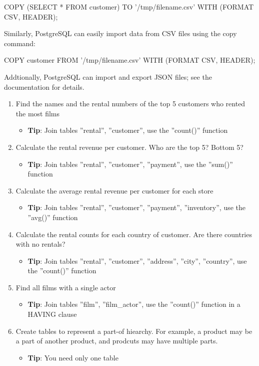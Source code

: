\begin{withcode}
\begin{sqlcode}
COPY (SELECT * FROM customer) 
  TO '/tmp/filename.csv' 
  WITH (FORMAT CSV, HEADER);
\end{sqlcode}

Similarly, PostgreSQL can easily import data from CSV files using the copy command:

\begin{sqlcode}
COPY customer 
  FROM '/tmp/filename.csv' 
  WITH (FORMAT CSV, HEADER);
\end{sqlcode}

Addtionally, PostgreSQL can import and export JSON files; see the documentation for details.

\begin{exerciseboxcomputer}
\begin{enumerate}
  \item Find the names and the rental numbers of the top 5 customers who rented the most films
  \begin{itemize}
    \item \textbf{Tip}: Join tables ''rental'', ''customer'', use the ''count()'' function
  \end{itemize}
  \item Calculate the rental revenue per customer. Who are the top 5? Bottom 5?
  \begin{itemize}
    \item \textbf{Tip}: Join tables ''rental'', ''customer'', ''payment'', use the ''sum()'' function
  \end{itemize}
  \item Calculate the average rental revenue per customer for each store
  \begin{itemize}
    \item \textbf{Tip}: Join tables ''rental'', ''customer'', ''payment'', ''inventory'', use the ''avg()'' function
  \end{itemize}
  \item Calculate the rental counts for each country of customer. Are there countries with no rentals?
  \begin{itemize}
    \item \textbf{Tip}: Join tables ''rental'', ''customer'', ''address'', ''city'', ''country'', use the ''count()'' function
  \end{itemize}
  \item Find all films with a single actor
  \begin{itemize}
    \item \textbf{Tip}: Join tables ''film'', ''film\_actor'', use the ''count()'' function in a HAVING clause
  \end{itemize}
  \item Create tables to represent a part-of hiearchy. For example, a product may be a part of another product, and prodcuts may have multiple parts.
  \begin{itemize}
    \item \textbf{Tip}: You need only one table
  \end{itemize}
\end{enumerate}
\end{exerciseboxcomputer}
\end{withcode}

